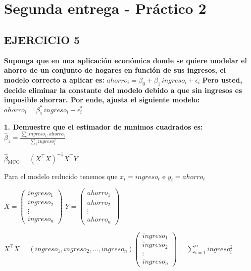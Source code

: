 \documentclass[
  letterpaper,
  DIV=11,
  numbers=noendperiod]{scrartcl}
\author{}
\date{}
\begin{document}
\ifdefined\Shaded\renewenvironment{Shaded}{\begin{tcolorbox}[boxrule=0pt, breakable, sharp corners, interior hidden, borderline west={3pt}{0pt}{shadecolor}, enhanced, frame hidden]}{\end{tcolorbox}}\fi

\hypertarget{segunda-entrega---pruxe1ctico-2}{%
\section{Segunda entrega - Práctico
2}\label{segunda-entrega---pruxe1ctico-2}}

\hypertarget{ejercicio-5}{%
\subsection{EJERCICIO 5}\label{ejercicio-5}}

\textbf{Suponga que en una aplicación económica donde se quiere modelar
el ahorro de un conjunto de hogares en función de sus ingresos, el
modelo correcto a aplicar es:}
\(ahorro_i = \beta_0 + \beta_1 \, ingreso_i + \epsilon_i\) \textbf{Pero
usted, decide eliminar la constante del modelo debido a que sin ingresos
es imposible ahorrar. Por ende, ajusta el siguiente modelo:}
\(ahorro_i = \beta_1^{*} \, ingreso_i + \epsilon_i^{*}\)

\textbf{1. Demuestre que el estimador de mınimos cuadrados es:}
\(\hat{\beta}_1 = \frac{\sum_i ingreso_i \cdot ahorro_i}{\sum_i ingreso_i^2}\)

\(\hat{\beta}_{\text{MCO}} = (X^{\top} X)^{-1} X^{\top} Y\)

Para el modelo reducido tenemos que \(x_i = ingreso_i\) e
\(y_i =ahorro_i\)

\(X= \begin{pmatrix}ingreso_1 \\ingreso_2 \\\vdots \\ingreso_n\end{pmatrix}\)
\(Y=\begin{pmatrix}ahorro_1 \\ahorro_2 \\\vdots \\ahorro_n\end{pmatrix}\)

\(X^{\top} X = (ingreso_1, ingreso_2, \ldots, ingreso_n)\begin{pmatrix} ingreso_1 \\ ingreso_2 \\ \vdots \\ ingreso_n\end{pmatrix}= \sum_{i=1}^n ingreso_i^2\)
\end{document}
